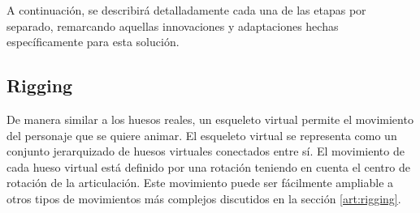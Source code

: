 %

A continuación, se describirá detalladamente cada una de las etapas por separado, remarcando aquellas innovaciones y adaptaciones hechas específicamente para esta solución.



\subsection{Rigging}
\label{posing:rigging}
De manera similar a los huesos reales, un esqueleto virtual permite el movimiento del personaje que se quiere animar. El esqueleto virtual se representa como un conjunto jerarquizado de huesos virtuales conectados entre sí. El movimiento de cada hueso virtual está definido por una rotación teniendo en cuenta el centro de rotación de la articulación. Este movimiento puede ser fácilmente ampliable a otros tipos de movimientos más complejos discutidos en la sección \ref{art:rigging}.


